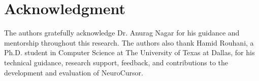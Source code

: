 \documentclass[conference]{IEEEtran}
\begin{document}
\section*{Acknowledgment}

The authors gratefully acknowledge Dr. Anurag Nagar for his guidance and
mentorship throughout this research. The authors also thank Hamid Rouhani,
a Ph.D. student in Computer Science at The University of Texas at Dallas,
for his technical guidance, research support, feedback, and contributions to
the development and evaluation of NeuroCursor.



\end{document}
